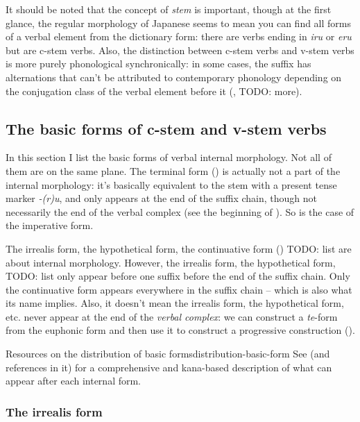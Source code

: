 \documentclass[UTF8, a4paper, oneside, scheme=plain]{ctexrep}
\newcommand*{\citesec}[1]{\S~{#1}}
\newcommand*{\term}[1]{\emph{#1}}
\newcommand{\corpus}[1]{\emph{#1}}
\begin{document}
It should be noted that the concept of \term{stem} is important,
though at the first glance, the regular morphology of Japanese seems to 
mean you can find all forms of a verbal element from the dictionary form:
there are verbs ending in \corpus{iru} or \corpus{eru} but are c-stem verbs.
Also, the distinction between c-stem verbs and v-stem verbs is more purely phonological synchronically:
in some cases, the suffix has alternations that can't be attributed to contemporary phonology 
depending on the conjugation class of the verbal element before it
(, TODO: more).

\subsection{The basic forms of c-stem and v-stem verbs}\label{sec:internal-forms}

In this section I list the basic forms of verbal internal morphology.
Not all of them are on the same plane.
The terminal form () is actually not a part of the internal morphology:
it's basically equivalent to the stem with a present tense marker \corpus{-(r)u},
and only appears at the end of the suffix chain,
though not necessarily the end of the verbal complex
(see the beginning of ).
So is the case of the imperative form.

The irrealis form, the hypothetical form, 
the continuative form () TODO: list
are about internal morphology.
However, the irrealis form, the hypothetical form, TODO: list 
only appear before one suffix before the end of the suffix chain.
Only the continuative form appears everywhere in the suffix chain -- 
which is also what its name implies.
Also, it doesn't mean the irrealis form, the hypothetical form, etc. 
never appear at the end of the \emph{verbal complex}:
we can construct a \corpus{te}-form from the euphonic form 
and then use it to construct a progressive construction (). 

\begin{infobox}{Resources on the distribution of basic forms}{distribution-basic-form}
    See \citet[\citesec{3.2.4}]{gu2004} (and references in it) 
    for a comprehensive and kana-based description of 
    what can appear after each internal form.
\end{infobox}

\subsubsection{The irrealis form}\label{sec:irrealis-form}
\end{document}
